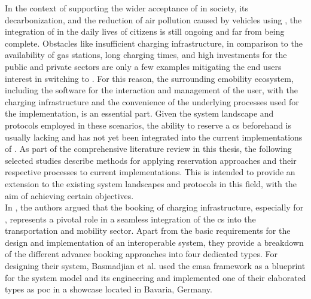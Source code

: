 In the context of supporting the wider acceptance of  in society, its decarbonization, and the reduction of air pollution caused by vehicles using  \cite{basmadjian_reference_2020}, the integration of  in the daily lives of citizens is still ongoing and far from being complete.
Obstacles like insufficient charging infrastructure, in comparison to the availability of gas stations, long charging times, and high investments for the public and private sectors \cite{basmadjian_reference_2020,orcioni_ev_2020} are only a few examples mitigating the end users interest in switching to .
For this reason, the surrounding \acrshort{emobility} ecosystem, including the software for the interaction and management of the user, with the charging infrastructure and the convenience of the underlying processes used for the implementation, is an essential part.
Given the system landscape and protocols employed in these scenarios, the ability to reserve a \acrshort{cs} beforehand is usually lacking and has not yet been integrated into the current implementations of .
As part of the comprehensive literature review in this thesis, the following selected studies describe methods for applying reservation approaches and their respective processes to current implementations. This is intended to provide an extension to the existing system landscapes and protocols in this field, with the aim of achieving certain objectives. \\
\noindent In \cite{basmadjian_interoperable_2019}, the authors argued that the booking of charging infrastructure, especially for , represents a pivotal role in a seamless integration of the \acrshort{cs} into the transportation and mobility sector.
Apart from the basic requirements for the design and implementation of an interoperable system, they provide a breakdown of the different advance booking approaches into four dedicated types.
For designing their system, Basmadjian et al. used the \acrshort{emsa} \cite{kirpes_e-mobility_2019} framework as a blueprint for the system model and its engineering and implemented one of their elaborated types as \acrshort{poc} in a showcase located in Bavaria, Germany.
